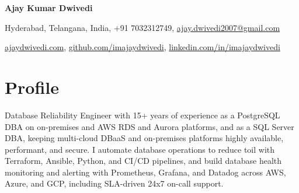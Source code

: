 \documentclass[10pt,a4paper]{article}
\begin{document}
\begin{center}
{\Huge\bfseries Ajay Kumar Dwivedi}

\vspace{6pt}
Hyderabad, Telangana, India, +91 7032312749, \href{mailto:ajay.dwivedi2007@gmail.com}{ajay.dwivedi2007@gmail.com}

\vspace{2pt}
\href{https://ajaydwivedi.com/}{ajaydwivedi.com}, \href{https://github.com/imajaydwivedi}{github.com/imajaydwivedi}, \href{https://linkedin.com/in/imajaydwivedi/}{linkedin.com/in/imajaydwivedi}
\end{center}

\section{Profile}
Database Reliability Engineer with 15+ years of experience as a PostgreSQL DBA on on-premises and AWS RDS and Aurora platforms, and as a SQL Server DBA, keeping multi-cloud DBaaS and on-premises platforms highly available, performant, and secure. I automate database operations to reduce toil with Terraform, Ansible, Python, and CI/CD pipelines, and build database health monitoring and alerting with Prometheus, Grafana, and Datadog across AWS, Azure, and GCP, including SLA-driven 24x7 on-call support.
\end{document}
